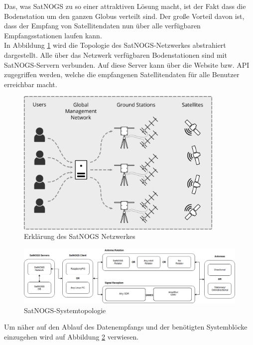 \documentclass[12pt]{scrreprt}
\begin{document}
	
	Das, was SatNOGS zu so einer attraktiven Lösung macht, ist der Fakt dass die Bodenstation um den ganzen Globus verteilt sind. Der große Vorteil davon ist, dass der Empfang von Satellitendaten nun über alle verfügbaren Empfangsstationen laufen kann.\\
	
	
	In Abbildung \ref{fig:SatNOGS_Erklärung} wird die Topologie des SatNOGS-Netzwerkes abstrahiert dargestellt.
	Alle über das Netzwerk verfügbaren Bodenstationen sind mit SatNOGS-Servern verbunden. Auf diese Server kann über die Website bzw. API zugegriffen werden, welche die empfangenen Satellitendaten für alle Benutzer erreichbar macht.
	
	\begin{figure}[!hbtp]%
		\centering
			\includegraphics[width=10cm]{../ref/SatNOGS_explanation}
			\caption{Erklärung des SatNOGS Netzwerkes}
			\label{fig:SatNOGS_Erklärung}
	\end{figure}	
	
	\begin{figure}[!hbtp]%
		\centering
			\includegraphics[width=16cm]{../ref/SatNOGS_BlockDiagram}
			\caption{SatNOGS-Systemtopologie}
			\label{fig:SatNOGS_Systemtopologie}
	\end{figure}
	
	Um näher auf den Ablauf des Datenempfangs und der benötigten Systemblöcke einzugehen wird auf Abbildung \ref{fig:SatNOGS_Systemtopologie} verwiesen.\\
\end{document}
